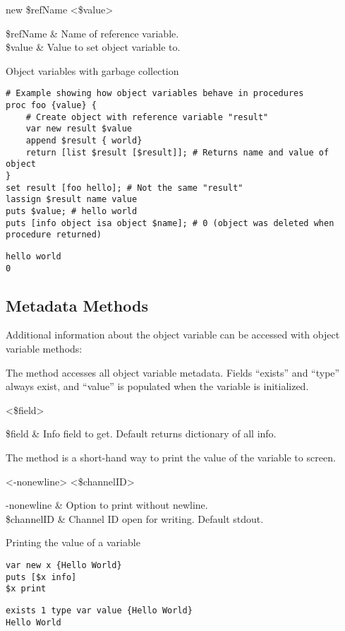 \documentclass{article}
\begin{document}
\begin{syntax}
 new \$refName <\$value>
\end{syntax}
\begin{args}
\$refName & Name of reference variable. \\
\$value & Value to set object variable to. 
\end{args}

\begin{example}{Object variables with garbage collection}
\begin{lstlisting}
# Example showing how object variables behave in procedures
proc foo {value} {
    # Create object with reference variable "result"
    var new result $value
    append $result { world}
    return [list $result [$result]]; # Returns name and value of object
}
set result [foo hello]; # Not the same "result"
lassign $result name value
puts $value; # hello world
puts [info object isa object $name]; # 0 (object was deleted when procedure returned)
\end{lstlisting}
\tcblower
\begin{lstlisting}
hello world
0
\end{lstlisting}
\end{example}


\clearpage
\subsection{Metadata Methods}
Additional information about the object variable can be accessed with object variable methods:

The method  accesses all object variable metadata. 
Fields ``exists'' and ``type'' always exist, and ``value'' is populated when the variable is initialized.
\begin{syntax}
 <\$field>
\end{syntax}
\begin{args}
\$field & Info field to get. Default returns dictionary of all info. \\
\end{args}

The method  is a short-hand way to print the value of the variable to screen.
\begin{syntax}
 <-nonewline> <\$channelID>
\end{syntax}
\begin{args}
-nonewline & Option to print without newline. \\
\$channelID & Channel ID open for writing. Default stdout.
\end{args}
\begin{example}{Printing the value of a variable}
\begin{lstlisting}
var new x {Hello World}
puts [$x info]
$x print
\end{lstlisting}
\tcblower
\begin{lstlisting}
exists 1 type var value {Hello World}
Hello World
\end{lstlisting}
\end{example}
\end{document}
